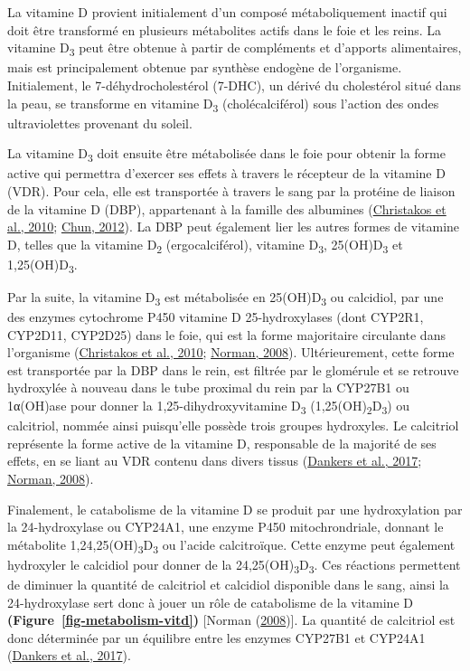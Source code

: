 \documentclass[
  letterpaper,
  DIV=11,
  numbers=noendperiod]{scrartcl}
\begin{document}
La vitamine D provient initialement d'un composé métaboliquement inactif
qui doit être transformé en plusieurs métabolites actifs dans le foie et
les reins. La vitamine D\textsubscript{3} peut être obtenue à partir de
compléments et d'apports alimentaires, mais est principalement obtenue
par synthèse endogène de l'organisme. Initialement, le
7-déhydrocholestérol (7-DHC), un dérivé du cholestérol situé dans la
peau, se transforme en vitamine D\textsubscript{3} (cholécalciférol)
sous l'action des ondes ultraviolettes provenant du soleil.

La vitamine D\textsubscript{3} doit ensuite être métabolisée dans le
foie pour obtenir la forme active qui permettra d'exercer ses effets à
travers le récepteur de la vitamine D (VDR). Pour cela, elle est
transportée à travers le sang par la protéine de liaison de la vitamine
D (DBP), appartenant à la famille des albumines
(\protect\hyperlink{ref-Christakos.2010}{Christakos et al., 2010};
\protect\hyperlink{ref-Chun.2012}{Chun, 2012}). La DBP peut également
lier les autres formes de vitamine D, telles que la vitamine
D\textsubscript{2} (ergocalciférol), vitamine D\textsubscript{3},
25(OH)D\textsubscript{3} et 1,25(OH)D\textsubscript{3}.

Par la suite, la vitamine D\textsubscript{3} est métabolisée en
25(OH)D\textsubscript{3} ou calcidiol, par une des enzymes cytochrome
P450 vitamine D 25-hydroxylases (dont CYP2R1, CYP2D11, CYP2D25) dans le
foie, qui est la forme majoritaire circulante dans l'organisme
(\protect\hyperlink{ref-Christakos.2010}{Christakos et al., 2010};
\protect\hyperlink{ref-Norman.2008}{Norman, 2008}). Ultérieurement,
cette forme est transportée par la DBP dans le rein, est filtrée par le
glomérule et se retrouve hydroxylée à nouveau dans le tube proximal du
rein par la CYP27B1 ou 1α(OH)ase pour donner la 1,25-dihydroxyvitamine
D\textsubscript{3} (1,25(OH)\textsubscript{2}D\textsubscript{3}) ou
calcitriol, nommée ainsi puisqu'elle possède trois groupes hydroxyles.
Le calcitriol représente la forme active de la vitamine D, responsable
de la majorité de ses effets, en se liant au VDR contenu dans divers
tissus (\protect\hyperlink{ref-Dankers.2017}{Dankers et al., 2017};
\protect\hyperlink{ref-Norman.2008}{Norman, 2008}).

Finalement, le catabolisme de la vitamine D se produit par une
hydroxylation par la 24-hydroxylase ou CYP24A1, une enzyme P450
mitochrondriale, donnant le métabolite
1,24,25(OH)\textsubscript{3}D\textsubscript{3} ou l'acide calcitroïque.
Cette enzyme peut également hydroxyler le calcidiol pour donner de la
24,25(OH)\textsubscript{3}D\textsubscript{3}. Ces réactions permettent
de diminuer la quantité de calcitriol et calcidiol disponible dans le
sang, ainsi la 24-hydroxylase sert donc à jouer un rôle de catabolisme
de la vitamine D \textbf{(Figure~\ref{fig-metabolism-vitd})} {[}Norman
(\protect\hyperlink{ref-Norman.2008}{2008}){]}. La quantité de
calcitriol est donc déterminée par un équilibre entre les enzymes
CYP27B1 et CYP24A1 (\protect\hyperlink{ref-Dankers.2017}{Dankers et al.,
2017}).
\end{document}
